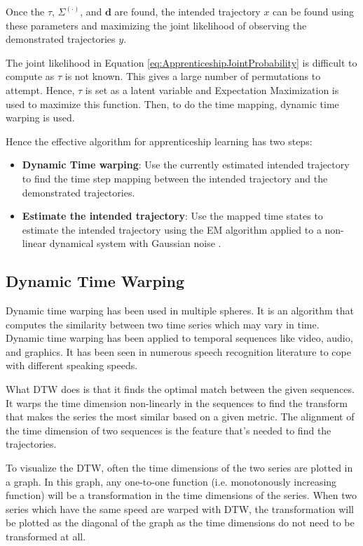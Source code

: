 \documentclass[hidelinks,BTech]{iitmdiss}
\begin{document}
Once the $\tau$, $\Sigma^{(\cdot)}$, and $\mathbf{d}$ are found, the intended trajectory $x$ can be found using these parameters and maximizing the joint likelihood of observing the demonstrated trajectories $y$.

The joint likelihood in Equation \ref{eq:ApprenticeshipJointProbability} is difficult to compute as $\tau$ is not known. This gives a large number of permutations to attempt. Hence, $\tau$ is set as a latent variable and Expectation Maximization is used to maximize this function. Then, to do the time mapping, dynamic time warping \cite{DTW} is used.

Hence the effective algorithm for apprenticeship learning has two steps:
\begin{itemize}
\item{{\bf Dynamic Time warping}: Use the currently estimated intended trajectory to find the time step mapping between the intended trajectory and the demonstrated trajectories.}
\item{{\bf Estimate the intended trajectory}: Use the mapped time states to estimate the intended trajectory using the EM algorithm applied to a non-linear dynamical system with Gaussian noise \cite{NonLinearEMKalman}.}
\end{itemize}

\subsection{Dynamic Time Warping}

Dynamic time warping \cite{DTW} has been used in multiple spheres. It is an algorithm that computes the similarity between two time series which may vary in time. Dynamic time warping has been applied to temporal sequences like video, audio, and graphics. It has been seen in  numerous speech recognition literature to cope with different speaking speeds.

What DTW does is that it finds the optimal match between the given sequences. It warps the time dimension non-linearly in the sequences to find the transform that makes the series the most similar based on a given metric. The alignment of the time dimension of two sequences is the feature that's needed to find the trajectories.

To visualize the DTW, often the time dimensions of the two series are plotted in a graph. In this graph, any one-to-one function (i.e. monotonously increasing function) will be a transformation in the time dimensions of the series. When two series which have the same speed are warped with DTW, the transformation will be plotted as the diagonal of the graph as the time dimensions do not need to be transformed at all.
\end{document}
